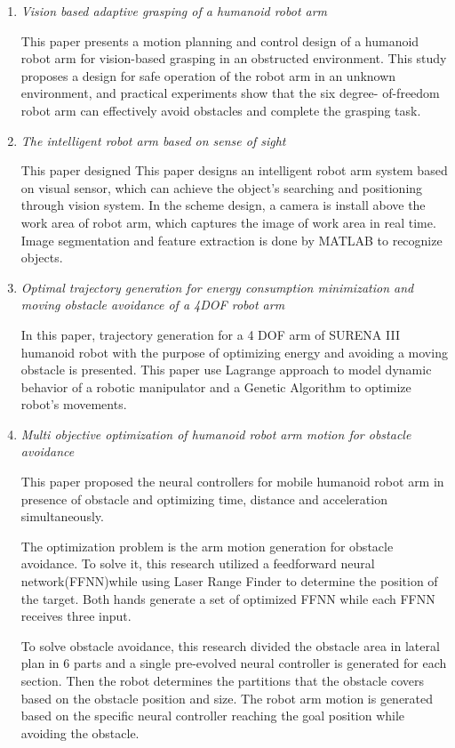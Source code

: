 \documentclass[10pt,twocolumn,letterpaper]{article}
\begin{document}
\begin{enumerate}
\item \textit{Vision \- based adaptive grasping of a humanoid robot arm} \cite{6308189}

This paper presents a motion planning and control design of a humanoid robot arm for vision-based grasping in an obstructed environment. This study proposes a design for safe operation of the robot arm in an unknown environment, and practical experiments show that the six degree- of-freedom robot arm can effectively avoid obstacles and complete the grasping task.

\item \textit{The intelligent robot arm based on sense of sight} \cite{7578727}

This paper designed This paper designs an intelligent robot arm system based on visual sensor,  which can achieve the object's searching and positioning through vision system. In the scheme design, a camera is install above the work area of robot arm, which captures the image of work area in real time. Image segmentation and feature extraction is done by MATLAB to recognize objects. 

\item \textit{Optimal trajectory generation for energy consumption minimization and moving obstacle avoidance of a 4DOF robot arm} \cite{7367810}

In this paper, trajectory generation for a 4 DOF arm of SURENA III humanoid robot with the purpose of optimizing energy and avoiding a moving obstacle is presented. This paper use Lagrange approach to model dynamic behavior of a robotic manipulator and a Genetic Algorithm to optimize robot's movements.

\item \textit{Multi objective optimization of humanoid robot arm motion for obstacle avoidance} \cite{7451596}

This paper proposed the neural controllers for mobile humanoid robot arm in presence of obstacle and optimizing time, distance and acceleration simultaneously.

The optimization problem is the arm motion generation for obstacle avoidance. To solve it, this research utilized a feedforward neural network(FFNN)while using Laser Range Finder to determine the position of the target. Both hands generate a set of optimized FFNN while each FFNN receives three input.

To solve obstacle avoidance, this research divided the obstacle area in lateral plan in 6 parts and a single pre-evolved neural controller is generated for each section. Then the robot determines the partitions that the obstacle covers based on the obstacle position and size. The robot arm motion is generated based on the specific neural controller reaching the goal position while avoiding the obstacle. 


\end{enumerate}
\end{document}
